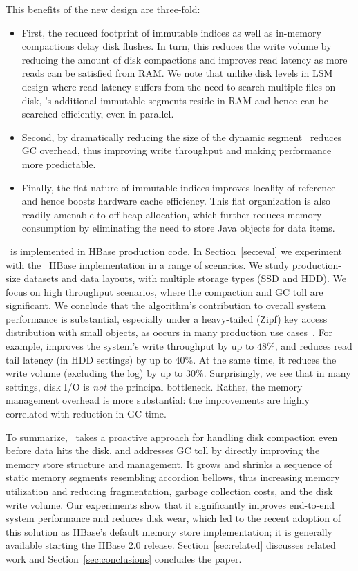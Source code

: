 This benefits of the new design are three-fold:
\begin{itemize} 
 \item First, the reduced footprint of immutable indices as well as in-memory compactions delay disk flushes. In turn, this reduces 
 the write volume by reducing the amount of disk compactions  and improves read latency as more reads can be satisfied from RAM.
We note that unlike disk levels in LSM design where read latency suffers from the need to
search multiple files on disk,  \sys's additional immutable segments reside in RAM and hence can be searched efficiently, even in parallel.
\item Second, by dramatically reducing the size of the dynamic segment  \sys\ reduces GC overhead, thus improving write throughput and making performance more predictable.
\item Finally, the flat nature of immutable indices improves locality of reference and hence boosts hardware cache efficiency. 
This flat organization is also readily amenable to off-heap allocation, which further reduces memory consumption
 by eliminating the need to store Java objects for data items. 
\end{itemize}
 
\sys\ is implemented in HBase production code. In Section~\ref{sec:eval} we experiment with the \sys\ HBase implementation in a range of scenarios.
We study production-size datasets and data layouts, with multiple storage types (SSD and HDD). 
We focus on high throughput scenarios, where the compaction and GC toll are significant. 
We conclude that the algorithm's contribution to overall system performance is substantial, 
especially under a  heavy-tailed (Zipf) key access distribution with 
small objects, as occurs in many production use cases~\cite{Wu2015}. For example, \sys\/ 
improves the system's write throughput by up to $48\%$, and reduces read tail latency 
(in HDD settings)  
by up to $40\%$. At the same time, it reduces the write volume (excluding the log) by up to $30\%$. Surprisingly, we see 
that in many settings, disk I/O is \emph{not} the principal bottleneck. Rather, the memory management 
overhead is more substantial: the improvements are highly correlated with  reduction in GC time. 

To summarize, \sys\ takes a proactive approach for handling disk compaction even before data hits the disk, and addresses GC toll by directly improving the memory store structure and management.
It grows and shrinks a sequence of static memory segments resembling accordion bellows, 
thus increasing memory utilization and reducing fragmentation, garbage collection costs, and the disk write volume. 
Our experiments show that it significantly improves end-to-end system performance and reduces disk wear, 
which led to the recent adoption of this solution as HBase's default memory store implementation; it is generally available starting the HBase 2.0 release.
 Section~\ref{sec:related} discusses related work 
and Section~\ref{sec:conclusions} concludes the paper.

